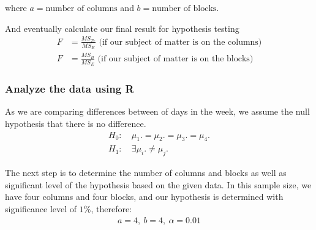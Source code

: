 \documentclass[a4paper]{article}
\numberwithin{equation}{section}
\begin{document}
where  \(a = \text{number of columns}\) and \(b = \text{number of blocks}\).

And eventually calculate our final result for hypothesis testing
\begin{align*}
  F & = \frac{MS_{Tr}}{MS_{E}} \text{ (if our subject of matter is on the columns)} \\
  F & = \frac{MS_{B}}{MS_{E}} \text{ (if our subject of matter is on the blocks)}
\end{align*}
\subsubsection{Analyze the data using R}

As we are comparing differences between of days in the week, we assume the null hypothesis that there is no difference.
\begin{align*}
  H_0: & \ \mu_1. = \mu_2. = \mu_3. = \mu_4. \\
  H_1: & \ \exists\mu_i. \neq \mu_j.
\end{align*}

The next step is to determine the number of columns and blocks as well as significant level of the hypothesis based on the given data. In this sample size, we have four columns and four blocks, and our hypothesis is determined with significance level of \(1\% \), therefore:
\begin{align*}
  a = 4,\ b = 4,\ \alpha = 0.01
\end{align*}
\end{document}
